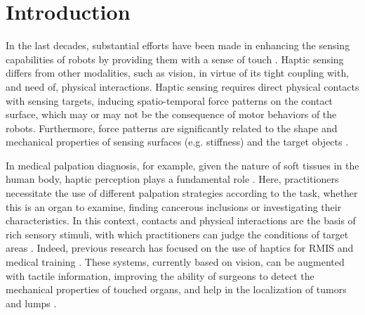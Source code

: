 
\section{Introduction}
In the last decades, substantial efforts have been made in enhancing the sensing capabilities 
of robots by providing them with a sense of touch \cite{dahiya_tactile_2010, drimus2014design}. Haptic sensing differs from other modalities, such as vision, in virtue of its tight coupling with, and need of, physical interactions. Haptic sensing requires direct physical contacts with sensing targets, inducing spatio-temporal force patterns on the contact surface, which may or may not be the consequence of motor behaviors of the robots. Furthermore, force patterns are significantly related to the shape and mechanical properties of sensing surfaces (e.g. stiffness) and the target objects \cite{scimecasoft, fumiya_2016}. 

In medical palpation diagnosis, for example, given the nature of soft tissues in the human body, 
haptic perception plays a fundamental role \cite{puangmali2008state}. 
Here, practitioners necessitate the use of different palpation strategies according to the task, whether this is an organ to examine, finding cancerous inclusions or 
investigating their characteristics. In this context, contacts and physical interactions are the basis of rich sensory stimuli, with which practitioners can judge the conditions of target areas \cite{palpation1,palpation2,palpation3}. Indeed, previous research has focused on the use of haptics for RMIS and medical training \cite{mclaughlin2002introduction}. These systems, currently based on vision, can be augmented with tactile information, improving the ability of surgeons to detect the mechanical properties of touched organs, and help in the localization of tumors and lumps \cite{Liza2014}.

